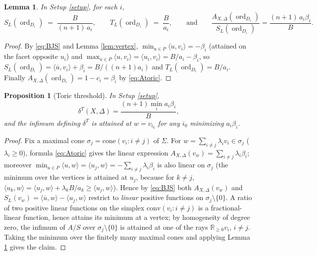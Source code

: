 \documentclass[11pt]{amsart}
\newtheorem{proposition}[theorem]{Proposition}
\newtheorem{lemma}[theorem]{Lemma}
\theoremstyle{definition}
\theoremstyle{remark}
\DeclareMathOperator{\ord}{ord}
\newcommand{\R}{\mathbb{R}}
\newcommand{\bary}{\overline{u}}
\begin{document}
\begin{lemma}\label{lem:Sray}
In Setup \textup{\ref{setup}}, for each \(i\),
\[
S_L(\ord_{D_i}) \;=\; \frac{B}{(n+1)\,a_i},
\qquad
T_L(\ord_{D_i}) \;=\; \frac{B}{a_i},
\qquad\text{and}\qquad
\frac{A_{X,\Delta}(\ord_{D_i})}{S_L(\ord_{D_i})}
=\frac{(n+1)\,a_i\beta_i}{B}.
\]
\end{lemma}

\begin{proof}
By \eqref{eq:BJS} and Lemma \ref{lem:vertex},
\(\min_{u\in P}\langle u,v_i\rangle=-\beta_i\) (attained on the facet
opposite \(u_i\)) and
\(\max_{u\in P}\langle u,v_i\rangle=\langle u_i,v_i\rangle=B/a_i-\beta_i\),
so
\(S_L(\ord_{D_i})=\langle\bary,v_i\rangle+\beta_i=B/((n+1)a_i)\)
and \(T_L(\ord_{D_i})=B/a_i\). Finally
\(A_{X,\Delta}(\ord_{D_i})=1-c_i=\beta_i\) by \eqref{eq:Atoric}.
\end{proof}

\begin{proposition}[Toric threshold]\label{prop:toric}
In Setup \textup{\ref{setup}},
\[
\delta^T(X,\Delta)=\frac{(n+1)\min_i a_i\beta_i}{B},
\]
and the infimum defining \(\delta^T\) is attained at \(w=v_{i_0}\) for any
\(i_0\) minimizing \(a_i\beta_i\).
\end{proposition}

\begin{proof}
Fix a maximal cone \(\sigma_j=\mathrm{cone}(v_i : i\ne j)\) of
\(\Sigma\). For \(w=\sum_{i\ne j}\lambda_iv_i\in\sigma_j\)
(\(\lambda_i\ge0\)), formula \eqref{eq:Atoric} gives the linear expression
\(A_{X,\Delta}(v_w)=\sum_{i\ne j}\lambda_i\beta_i\); moreover
\(\min_{u\in P}\langle u,w\rangle = \langle u_j,w\rangle
=-\sum_{i\ne j}\lambda_i\beta_i\)
is also linear on \(\sigma_j\) (the minimum over the vertices is attained
at \(u_j\), because for \(k\ne j\),
\(\langle u_k,w\rangle=\langle u_j,w\rangle+\lambda_kB/a_k\ge\langle
u_j,w\rangle\)). Hence by \eqref{eq:BJS} both \(A_{X,\Delta}(v_w)\) and
\(S_L(v_w)=\langle\bary,w\rangle-\langle u_j,w\rangle\) restrict to
\emph{linear} positive functions on \(\sigma_j\setminus\{0\}\). A ratio of
two positive linear functions on the simplex
\(\mathrm{conv}(v_i: i\neq j)\) is a fractional-linear function, hence
attains its minimum at a vertex; by homogeneity of degree zero, the
infimum of \(A/S\) over \(\sigma_j\setminus\{0\}\) is attained at one of
the rays \(\R_{\ge0}v_i\), \(i\ne j\). Taking the minimum over the
finitely many maximal cones and applying Lemma \ref{lem:Sray} gives the
claim.
\end{proof}
\end{document}
